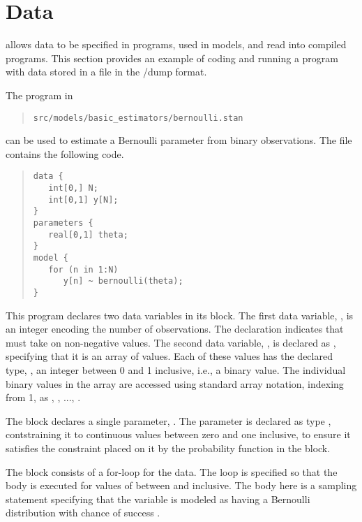 \section{Data}

\Stan allows data to be specified in programs, used in models, and
read into compiled \Stan programs. This section provides an example of
coding and running a \Stan program with data stored in a file in the
\SPLUS/\R dump format.

The \Stan program in 
\begin{quote}
\begin{Verbatim}
src/models/basic_estimators/bernoulli.stan
\end{Verbatim}
\end{quote}
can be used to estimate a Bernoulli parameter  from
 binary observations.  The file contains the following code.
%
\begin{quote}
\begin{Verbatim}
data {
   int[0,] N;
   int[0,1] y[N];
}
parameters {
   real[0,1] theta;
}
model {
   for (n in 1:N)
      y[n] ~ bernoulli(theta);
}
\end{Verbatim}
\end{quote}
%
This program declares two data variables in its  block.
The first data variable, , is an integer encoding the number
of observations.  The declaration  indicates that
 must take on non-negative values.  The second data variable,
, is declared as , specifying that it is an array
of  values.  Each of these values has the declared type,
, an integer between 0 and 1 inclusive, i.e., a binary
value.  The  individual binary values in the array 
are accessed using standard array notation, indexing from 1, as ,
, ..., .

The  block declares a single parameter, .
The parameter  is declared as type ,
contstraining it to continuous values between zero and one inclusive,
to ensure it satisfies the constraint placed on it by the probability
function  in the  block.

The  block consists of a for-loop for the data.   The loop is
specified so that the body is executed for values of  between
 and  inclusive.  The body here is a sampling
statement specifying that the variable  is modeled as
having a Bernoulli distribution with chance of success .  

